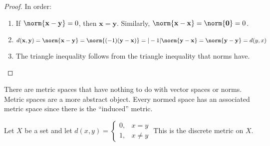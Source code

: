 \documentclass[crop=false,class=book,oneside]{standalone}
\begin{document}
            \begin{proof}
                In order:
                \begin{enumerate}
                    \item If $\norm{\mathbf{x}-\mathbf{y}}=0$,
                          then $\mathbf{x}=\mathbf{y}$.
                          Similarly,
                          $\norm{\mathbf{x}-\mathbf{x}}%
                           =\norm{\mathbf{0}}=0$.
                    \item $d(\mathbf{x},\mathbf{y})%
                           =\norm{\mathbf{x}-\mathbf{y}}%
                           =\norm{(-1)(\mathbf{y}-\mathbf{x})}%
                           =|-1|\norm{\mathbf{y}-\mathbf{x}}%
                           =\norm{\mathbf{y}-\mathbf{y}}%
                           =d(y,x)$
                    \item The triangle inequality follows
                          from the triangle inequality that
                          norms have.
                \end{enumerate}
            \end{proof}
            There are metric spaces that have nothing to do
            with vector spaces or norms. Metric spaces are
            a more abstract object. Every normed space
            has an associated metric space since there
            is the ``induced'' metric.
            \begin{example}
                Let $X$ be a set and let
                $d(x,y)=\begin{cases}%
                            0,&x=y\\%
                            1,&{x}\ne{y}%
                        \end{cases}$
                This is the discrete metric on $X$.
            \end{example}
\end{document}
